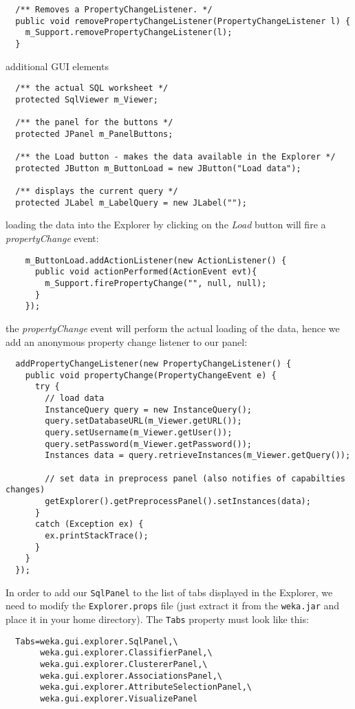 \begin{tight_itemize}
\begin{verbatim}
  /** Removes a PropertyChangeListener. */
  public void removePropertyChangeListener(PropertyChangeListener l) {
    m_Support.removePropertyChangeListener(l);
  }
  \end{verbatim}

  \newpage
  \item additional GUI elements
  \begin{verbatim}
  /** the actual SQL worksheet */
  protected SqlViewer m_Viewer;

  /** the panel for the buttons */
  protected JPanel m_PanelButtons;

  /** the Load button - makes the data available in the Explorer */
  protected JButton m_ButtonLoad = new JButton("Load data");

  /** displays the current query */
  protected JLabel m_LabelQuery = new JLabel("");
  \end{verbatim}

  \item loading the data into the Explorer by clicking on the \textit{Load}
button will fire a \textit{propertyChange} event:
  \begin{verbatim}
    m_ButtonLoad.addActionListener(new ActionListener() {
      public void actionPerformed(ActionEvent evt){
        m_Support.firePropertyChange("", null, null);
      }
    });
  \end{verbatim}

  \item the \textit{propertyChange} event will perform the actual loading of the
data, hence we add an anonymous property change listener to our panel:
  \begin{verbatim}
  addPropertyChangeListener(new PropertyChangeListener() {
    public void propertyChange(PropertyChangeEvent e) {
      try {
        // load data
        InstanceQuery query = new InstanceQuery();
        query.setDatabaseURL(m_Viewer.getURL());
        query.setUsername(m_Viewer.getUser());
        query.setPassword(m_Viewer.getPassword());
        Instances data = query.retrieveInstances(m_Viewer.getQuery());

        // set data in preprocess panel (also notifies of capabilties changes)
        getExplorer().getPreprocessPanel().setInstances(data);
      }
      catch (Exception ex) {
        ex.printStackTrace();
      }
    }
  });
  \end{verbatim}

  \item In order to add our \texttt{SqlPanel} to the list of tabs displayed in
the Explorer, we need to modify the \texttt{Explorer.props} file (just extract
it from the \texttt{weka.jar} and place it in your home directory). The
\texttt{Tabs} property must look like this:
  \begin{verbatim}
  Tabs=weka.gui.explorer.SqlPanel,\
       weka.gui.explorer.ClassifierPanel,\
       weka.gui.explorer.ClustererPanel,\
       weka.gui.explorer.AssociationsPanel,\
       weka.gui.explorer.AttributeSelectionPanel,\
       weka.gui.explorer.VisualizePanel
  \end{verbatim}
\end{tight_itemize}

